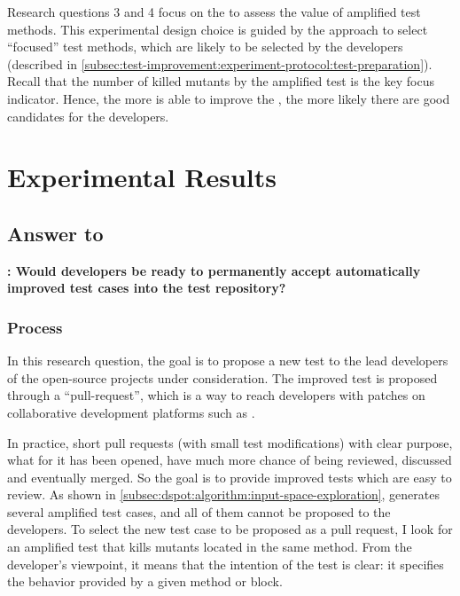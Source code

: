 Research questions 3 and 4 focus on the \ms to assess the value of amplified test methods.
This experimental design choice is guided by the approach to select ``focused'' test methods, which are likely to be selected by the developers (described in \autoref{subsec:test-improvement:experiment-protocol:test-preparation}). 
Recall that the number of killed mutants by the amplified test is the key focus indicator. 
Hence, the more \dspot is able to improve the \ms, the more likely there are good candidates for the developers.

\section{Experimental Results}
\label{sec:test-improvement:experiment-results}


\subsection{Answer to \rqpullrequest}
\label{subsec:test-improvement:experiment-results:rq1}

\textbf{\rqpullrequest: Would developers be ready to permanently accept automatically improved test cases into the test repository?}

\subsubsection{Process}

In this research question, the goal is to propose a new test to the lead developers of the open-source projects under consideration. 
The improved test is proposed through a ``pull-request'', which is a way to reach developers with patches on collaborative development platforms such as \gh.

In practice, short pull requests (\ie with small test modifications) with clear purpose, \ie what for it has been opened, have much more chance of being reviewed, discussed and eventually merged. 
So the goal is to provide improved tests which are easy to review.
As shown in \autoref{subsec:dspot:algorithm:input-space-exploration}, \dspot generates several amplified test cases, and all of them cannot be proposed to the developers.
To select the new test case to be proposed as a pull request, I look for an amplified test that kills mutants located in the same method.
From the developer's viewpoint, it means that the intention of the test is clear: it specifies the behavior provided by a given method or block.

